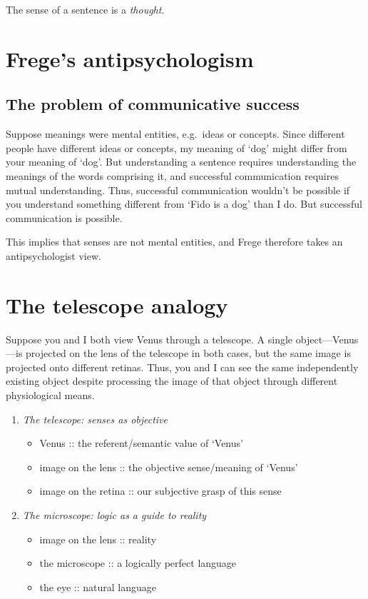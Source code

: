 \begin{definition}
The sense of a sentence is a \emph{thought}.
\end{definition}

\section{Frege's antipsychologism}

\subsection*{The problem of communicative success}

Suppose meanings were mental entities, e.g.\ ideas or concepts. Since different people have different ideas or concepts, my meaning of `dog' might differ from your meaning of `dog'. But understanding a sentence requires understanding the meanings of the words comprising it, and successful communication requires mutual understanding. Thus, successful communication wouldn't be possible if you understand something different from `Fido is a dog' than I do. But successful communication is possible.

This implies that senses are not mental entities, and Frege therefore takes an antipsychologist view.

\section{The telescope analogy}

Suppose you and I both view Venus through a telescope. A single object---Venus---is projected on the lens of the telescope in both cases, but the same image is projected onto different retinas. Thus, you and I can see the same independently existing object despite processing the image of that object through different physiological means.

\begin{slide}
\begin{enumerate}
  \item \emph{The telescope: senses as objective}
  \begin{itemize}
    \item Venus :: the referent/semantic value of `Venus'
    \item image on the lens :: the objective sense/meaning of `Venus'
    \item image on the retina :: our subjective grasp of this sense
  \end{itemize}
  \item \emph{The microscope: logic as a guide to reality}
  \begin{itemize}
    \item image on the lens :: reality
    \item the microscope :: a logically perfect language
    \item the eye :: natural language
  \end{itemize}
\end{enumerate}
\end{slide}

